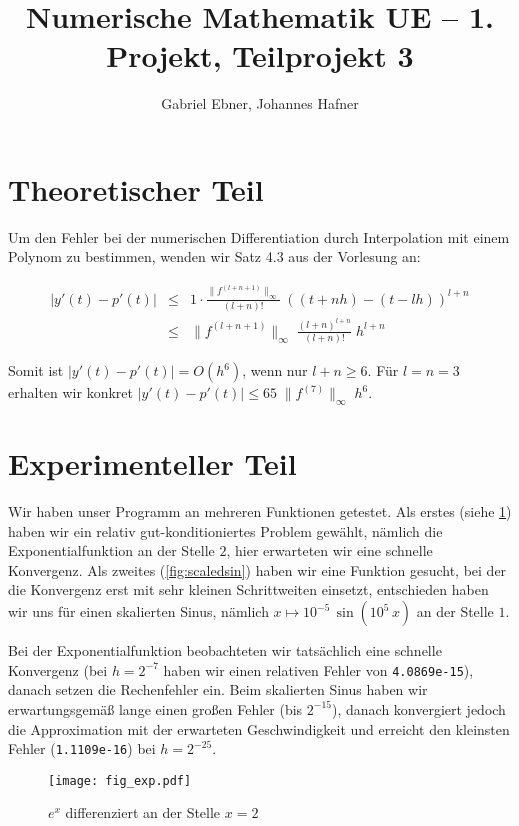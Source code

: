 \documentclass{scrartcl}
\begin{document}
\title{Numerische Mathematik UE -- 1. Projekt, Teilprojekt 3}
\author{Gabriel Ebner, Johannes Hafner}
\maketitle

\section{Theoretischer Teil}

Um den Fehler bei der numerischen Differentiation durch Interpolation mit einem
Polynom zu bestimmen, wenden wir Satz 4.3 aus der Vorlesung an:

\begin{eqnarray*}
|y'(t) - p'(t)| &\leq& 1 \cdot
    \frac{\|f^{(l+n+1)}\|_\infty}{(l+n)!}\; ((t+nh) - (t-lh))^{l+n} \\
  &\leq& \|f^{(l+n+1)}\|_\infty\; \frac{(l+n)^{l+n}}{(l+n)!}\; h^{l+n}
\end{eqnarray*}

Somit ist \(|y'(t)-p'(t)| = O(h^6)\), wenn nur \(l+n \geq 6\).  Für \(l=n=3\)
erhalten wir konkret \(|y'(t)-p'(t)| \leq 65\; \|f^{(7)}\|_\infty\; h^6\).

\section{Experimenteller Teil}

Wir haben unser Programm an mehreren Funktionen getestet.  Als erstes (siehe
\ref{fig:exp}) haben wir ein relativ gut-konditioniertes Problem gewählt,
nämlich die Exponentialfunktion an der Stelle \(2\), hier erwarteten wir eine
schnelle Konvergenz.  Als zweites (\ref{fig:scaledsin}) haben wir eine Funktion
gesucht, bei der die Konvergenz erst mit sehr kleinen Schrittweiten einsetzt,
entschieden haben wir uns für einen skalierten Sinus, nämlich \(x \mapsto
10^{-5}\, \sin(10^5\, x)\) an der Stelle \(1\).

Bei der Exponentialfunktion beobachteten wir tatsächlich eine schnelle
Konvergenz (bei \(h=2^{-7}\) haben wir einen relativen Fehler von
\verb|4.0869e-15|), danach setzen die Rechenfehler ein.  Beim skalierten Sinus
haben wir erwartungsgemäß lange einen großen Fehler (bis \(2^{-15}\)), danach
konvergiert jedoch die Approximation mit der erwarteten Geschwindig\-keit und
erreicht den kleinsten Fehler (\verb|1.1109e-16|) bei \(h=2^{-25}\).

\begin{figure}[!htb]
\centering
\texttt{[image: fig\_exp.pdf]}
\caption{\(e^x\) differenziert an der Stelle \(x=2\)}
\label{fig:exp}
\end{figure}
\end{document}

